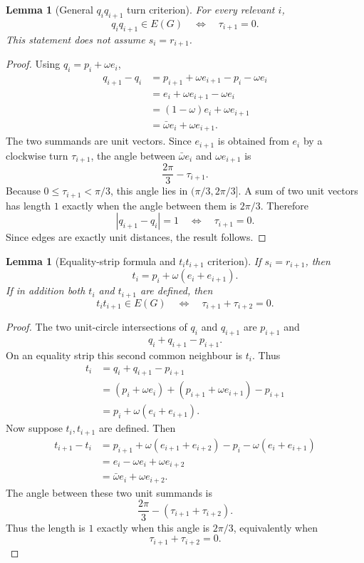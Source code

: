 \documentclass[11pt]{article}
\newtheorem{lemma}[theorem]{Lemma}
\begin{document}
\begin{lemma}[General $q_iq_{i+1}$ turn criterion]\label{lem:q-turn}
For every relevant $i$,
\[
 q_iq_{i+1}\in E(G)
 \quad\Longleftrightarrow\quad
 \tau_{i+1}=0.
\]
This statement does not assume $s_i=r_{i+1}$.
\end{lemma}

\begin{proof}
Using $q_i=p_i+\omega e_i$,
\[
\begin{aligned}
 q_{i+1}-q_i
 &=p_{i+1}+\omega e_{i+1}-p_i-\omega e_i\\
 &=e_i+\omega e_{i+1}-\omega e_i\\
 &=(1-\omega)e_i+\omega e_{i+1}\\
 &=\bar\omega e_i+\omega e_{i+1}.
\end{aligned}
\]
The two summands are unit vectors. Since $e_{i+1}$ is obtained from $e_i$ by a clockwise turn $\tau_{i+1}$, the angle between $\bar\omega e_i$ and $\omega e_{i+1}$ is
\[
 \frac{2\pi}{3}-\tau_{i+1}.
\]
Because $0\le \tau_{i+1}<\pi/3$, this angle lies in $(\pi/3,2\pi/3]$. A sum of two unit vectors has length $1$ exactly when the angle between them is $2\pi/3$. Therefore
\[
 |q_{i+1}-q_i|=1
 \quad\Longleftrightarrow\quad
 \tau_{i+1}=0.
\]
Since edges are exactly unit distances, the result follows.
\end{proof}

\begin{lemma}[Equality-strip formula and $t_it_{i+1}$ criterion]\label{lem:t-equality}
If $s_i=r_{i+1}$, then
\[
 t_i=p_i+\omega(e_i+e_{i+1}).
\]
If in addition both $t_i$ and $t_{i+1}$ are defined, then
\[
 t_it_{i+1}\in E(G)
 \quad\Longleftrightarrow\quad
 \tau_{i+1}+\tau_{i+2}=0.
\]
\end{lemma}

\begin{proof}
The two unit-circle intersections of $q_i$ and $q_{i+1}$ are $p_{i+1}$ and
\[
 q_i+q_{i+1}-p_{i+1}.
\]
On an equality strip this second common neighbour is $t_i$. Thus
\[
\begin{aligned}
 t_i&=q_i+q_{i+1}-p_{i+1}\\
 &=(p_i+\omega e_i)+(p_{i+1}+\omega e_{i+1})-p_{i+1}\\
 &=p_i+\omega(e_i+e_{i+1}).
\end{aligned}
\]
Now suppose $t_i,t_{i+1}$ are defined. Then
\[
\begin{aligned}
 t_{i+1}-t_i
 &=p_{i+1}+\omega(e_{i+1}+e_{i+2})-p_i-\omega(e_i+e_{i+1})\\
 &=e_i-\omega e_i+\omega e_{i+2}\\
 &=\bar\omega e_i+\omega e_{i+2}.
\end{aligned}
\]
The angle between these two unit summands is
\[
 \frac{2\pi}{3}-(\tau_{i+1}+\tau_{i+2}).
\]
Thus the length is $1$ exactly when this angle is $2\pi/3$, equivalently when
\[
 \tau_{i+1}+\tau_{i+2}=0.
\]
\end{proof}
\end{document}
